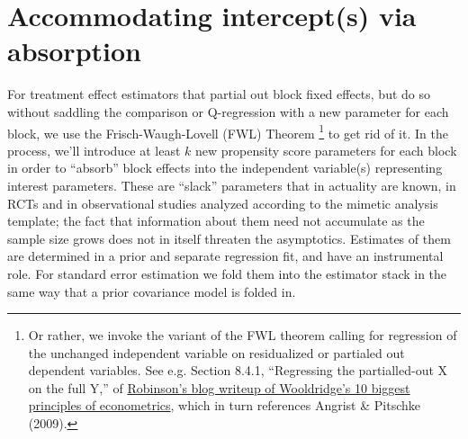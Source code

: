 \documentclass{article}
\begin{document}
\section{Accommodating intercept(s) via absorption}\label{sec:accomm-interc-via}
For treatment effect estimators that partial out block fixed effects,
but do so without saddling the comparison or Q-regression with a new
parameter for each block, we use the
Frisch-Waugh-Lovell (FWL) Theorem%
\footnote{Or rather, we invoke the variant of the FWL theorem calling
  for regression of the unchanged independent variable on residualized
or partialed out dependent variables.  See e.g. Section 8.4.1,
``Regressing the partialled-out X on the full Y,'' of
\href{https://bookdown.org/ts_robinson1994/10_fundamental_theorems_for_econometrics/frisch.html}{Robinson's
  blog writeup of Wooldridge's 10 biggest principles of econometrics},
which in turn references Angrist \& Pitschke (2009).} to get rid of
it.  In the process, we'll introduce at least $k$ new propensity score parameters
for each block in order to ``absorb'' block effects into the
independent variable(s) representing interest parameters.
These are ``slack'' parameters that
in actuality are known, in RCTs and in observational studies analyzed
according to the mimetic analysis template;  the fact that information about them
need not accumulate as the sample size grows does not in itself
threaten the asymptotics. Estimates of them are determined in a prior and separate regression
fit, and have an instrumental role.
For standard error estimation we fold them into the estimator stack in the same way that a prior
covariance model is folded in.
\end{document}
